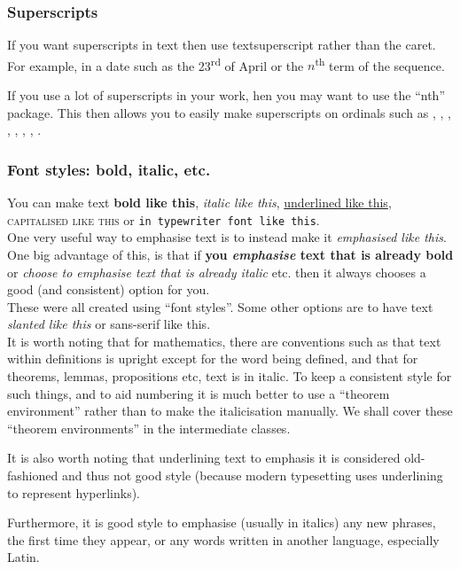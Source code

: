 \documentclass[a4paper,11pt]{article}
\begin{document}
\subsubsection{Superscripts }
If you want superscripts in text then use textsuperscript rather than the caret. %
For example, in a date such as the 23\textsuperscript{rd} of April or the $n$\textsuperscript{th} term of the sequence.

If you use a lot of superscripts in your work, hen you may want to use the ``nth'' package. This then allows you to easily make superscripts on ordinals such as , , , , , , , .


\subsubsection{Font styles: bold, italic, etc. }

You can make text
\textbf{bold like this},
\textit{italic like this},
\underline{underlined like this},
\textsc{capitalised like this} or
\texttt{in typewriter font like this}.\\

One very useful way to emphasise text is to instead make it \emph{emphasised like this}. One big advantage of this, is that if \textbf{you \emph{emphasise} text that is already bold} or \textit{choose to \emph{emphasise} text that is already italic } etc. then it always chooses a good (and consistent) option for you.\\

These were all created using ``font styles''. Some other options are to have text \textsl{slanted like this} or \textsf{sans-serif like this}.\\

It is worth noting that for mathematics, there are conventions such as that text within  definitions is  upright except for the word being defined, and that for theorems, lemmas, propositions etc, text is in italic. To keep a consistent style for such things, and to aid numbering it is much better to use a ``theorem environment'' rather than to make the italicisation manually. We shall cover these ``theorem environments'' in the intermediate classes.

It is also worth noting that underlining text to emphasis it is considered old-fashioned and thus not good style (because modern typesetting uses underlining to represent hyperlinks).

Furthermore, it is good style to emphasise (usually in italics) any new phrases, the first time they appear, or any words written in another language, especially Latin.
\end{document}
